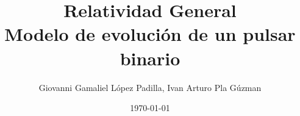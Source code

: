 \documentclass[aspectratio=169]{beamer}
\title[]{Relatividad General\\Modelo de evolución de un pulsar binario}
\author{Giovanni Gamaliel López Padilla, Ivan Arturo Pla Gúzman}
\date{\today}
\begin{document}
\begin{frame}[plain]
\maketitle
\end{frame}







\end{document}
